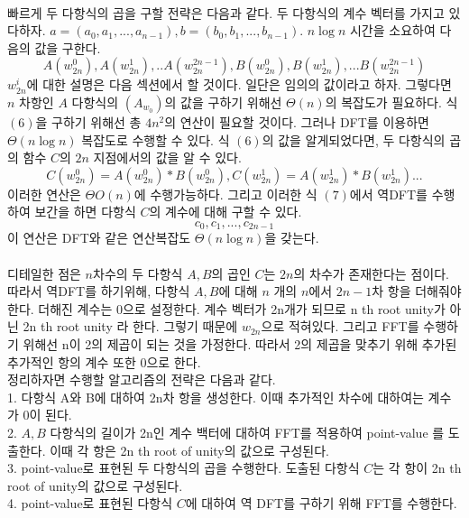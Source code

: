 \documentclass{article}
\begin{document}
\normalsize
\\
빠르게 두 다항식의 곱을 구할 전략은 다음과 같다. 두 다항식의 계수 벡터를 가지고 있다하자. $a = (a_0, a_1, ... ,a_{n-1}), b = (b_0, b_1, ... , b_{n-1})$. $n \log n$ 시간을 소요하여 다음의 값을 구한다. 
\[
    A(w_{2n}^0), A(w_{2n}^1), .. A(w_{2n}^{2n-1}), B(w_{2n}^0), B(w_{2n}^1), ... B(w_{2n}^{2n-1})\tag{6}
    \]
$w_{2n}^i$에 대한 설명은 다음 섹션에서 할 것이다. 일단은 임의의 값이라고 하자. 
그렇다면 $n$ 차항인 $A$ 다항식의 $(A_{w_0})$의 값을 구하기 위해선 $\Theta (n)$의 복잡도가 필요하다. 식 $(6)$을 구하기 위해선 총 $4n^2$의 연산이 필요할 것이다. 
그러나 DFT를 이용하면 $\Theta (n \log n)$ 복잡도로 수행할 수 있다. 
식 $(6)$의 값을 알게되었다면, 두 다항식의 곱의 함수 $C$의 $2n$ 지점에서의 값을 알 수 있다. 
\[
    C(w_{2n}^0) = A(w_{2n}^0)*B(w_{2n}^0), C(w_{2n}^1) = A(w_{2n}^1)*B(w_{2n}^1) ... \tag{7}
\]
이러한 연산은 $\Theta O(n)$에 수행가능하다. 그리고 이러한 식 $(7)$에서 역DFT를 수행하여 보간을 하면 다항식 $C$의 계수에 대해 구할 수 있다. 
\[
    c_0, c_1, ..., c_{2n-1}
\]
이 연산은 DFT와 같은 연산복잡도 $\Theta (n \log n)$을 갖는다. 
\\\\
디테일한 점은 $n$차수의 두 다항식 $A, B$의 곱인 $C$는 $2n$의 차수가 존재한다는 점이다. 
따라서 역DFT를 하기위해, 다항식 $A, B$에 대해 $n$ 개의 $n$에서 $2n-1$차 항을 더해줘야한다.
더해진 계수는 0으로 설정한다. 계수 벡터가 2n개가 되므로 n th root unity가 아닌 2n th root unity 라 한다. 
그렇기 때문에 $w_{2n}$으로 적혀있다. 그리고 FFT를 수행하기 위해선 n이 2의 제곱이 되는 것을 가정한다. 
따라서 2의 제곱을 맞추기 위해 추가된 추가적인 항의 계수 또한 0으로 한다.
\\
정리하자면 수행할 알고리즘의 전략은 다음과 같다. 
\\
1. 다항식 A와 B에 대하여 2n차 항을 생성한다. 이때 추가적인 차수에 대하여는 계수가 0이 된다. 
\\
2. $A, B$ 다항식의 길이가 2n인 계수 백터에 대하여 FFT를 적용하여 point-value 를 도출한다. 
이때 각 항은 2n th root of unity의 값으로 구성된다.
\\
3. point-value로 표현된 두 다항식의 곱을 수행한다. 
도출된 다항식 $C$는 각 항이 2n th root of unity의 값으로 구성된다. 
\\
4. point-value로 표현된 다항식 $C$에 대하여 역 DFT를 구하기 위해 FFT를 수행한다.
\end{document}
